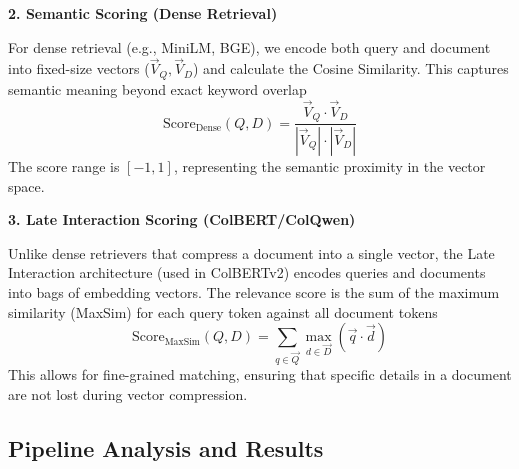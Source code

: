 \textbf{2. Semantic Scoring (Dense Retrieval)}

For dense retrieval (e.g., MiniLM, BGE), we encode both query and document into fixed-size vectors ($\vec{V}_Q, \vec{V}_D$) and calculate the Cosine Similarity. This captures semantic meaning beyond exact keyword overlap
\begin{equation*}
    \text{Score}_{\text{Dense}}(Q, D) = \frac{\vec{V}_{Q} \cdot \vec{V}_{D}}{|\vec{V}_{Q}| \cdot |\vec{V}_{D}|}
\end{equation*}
The score range is $[-1, 1]$, representing the semantic proximity in the vector space.

\textbf{3. Late Interaction Scoring (ColBERT/ColQwen)}

Unlike dense retrievers that compress a document into a single vector, the Late Interaction architecture (used in ColBERTv2) encodes queries and documents into bags of embedding vectors. The relevance score is the sum of the maximum similarity (MaxSim) for each query token against all document tokens
\begin{equation*}
    \text{Score}_{\text{MaxSim}}(Q, D) = \sum_{q \in \vec{Q}} \max_{d \in \vec{D}} (\vec{q} \cdot \vec{d})
\end{equation*}
This allows for fine-grained matching, ensuring that specific details in a document are not lost during vector compression.



\subsection{Pipeline Analysis and Results}

